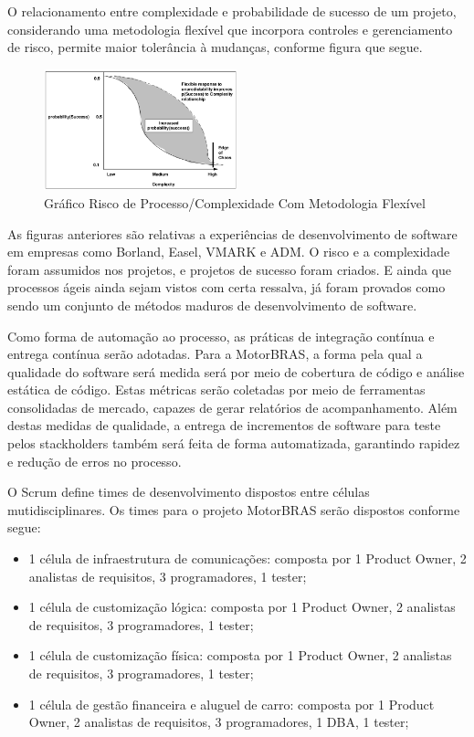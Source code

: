 \documentclass[12pt,journal,compsoc]{IEEEtran}
\begin{document}
O relacionamento entre complexidade e probabilidade de sucesso de um projeto, considerando uma metodologia flexível que incorpora controles e gerenciamento de risco, permite maior tolerância à mudanças, conforme figura que segue. 

\begin{figure}[ht!]
\centering
\includegraphics[width=0.5\textwidth]{scrum_risk_complexity_graph_02}
\caption{Gráfico Risco de Processo/Complexidade Com Metodologia Flexível \cite{scrum_development_process}}
\label{fig:scrum_risk_complexity_graph_02}
\end{figure}

As figuras anteriores são relativas a experiências de desenvolvimento de software em empresas como Borland, Easel, VMARK e ADM. O risco e a complexidade foram assumidos nos projetos, e projetos de sucesso foram criados. E ainda que processos ágeis ainda sejam vistos com certa ressalva, já foram provados como sendo um conjunto de métodos maduros de desenvolvimento de software. \cite{agile_meth_hype_reality}

Como forma de automação ao processo, as práticas de integração contínua e entrega contínua serão adotadas. Para a MotorBRAS, a forma pela qual a qualidade do software será medida será por meio de cobertura de código e análise estática de código. Estas métricas serão coletadas por meio de ferramentas consolidadas de mercado, capazes de gerar relatórios de acompanhamento. Além destas medidas de qualidade, a entrega de incrementos de software para teste pelos stackholders também será feita de forma automatizada, garantindo rapidez e redução de erros no processo.   

O Scrum define times de desenvolvimento dispostos entre células mutidisciplinares. Os times para o projeto MotorBRAS serão dispostos conforme segue:

\begin{itemize}
\item 1 célula de infraestrutura de comunicações: composta por 1 Product Owner, 2 analistas de requisitos, 3 programadores, 1 tester; 
\item 1 célula de customização lógica: composta por 1 Product Owner, 2 analistas de requisitos, 3 programadores, 1 tester;
\item 1 célula de customização física: composta por 1 Product Owner, 2 analistas de requisitos, 3 programadores, 1 tester;
\item 1 célula de gestão financeira e aluguel de carro: composta por 1 Product Owner, 2 analistas de requisitos, 3 programadores, 1 DBA, 1 tester;
\end{itemize}
\end{document}
